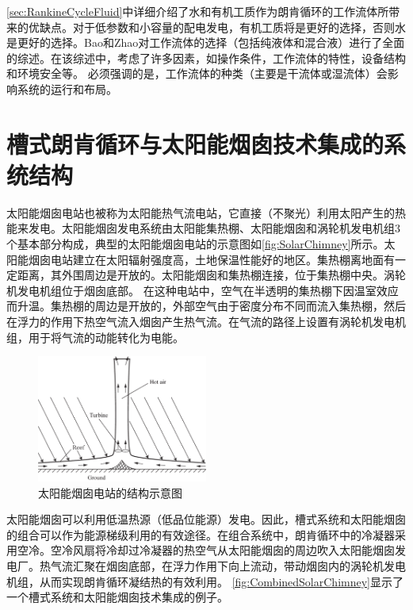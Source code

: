 \autoref{sec:RankineCycleFluid}中详细介绍了水和有机工质作为朗肯循环的工作流体所带来的优缺点。对于低参数和小容量的配电发电，有机工质将是更好的选择，否则水是更好的选择。Bao和Zhao\cite{Bao2013}对工作流体的选择（包括纯液体和混合液）进行了全面的综述。在该综述中，考虑了许多因素，如操作条件，工作流体的特性，设备结构和环境安全等。
必须强调的是，工作流体的种类（主要是干流体或湿流体）会影响系统的运行和布局。

\section{槽式朗肯循环与太阳能烟囱技术集成的系统结构}
\label{sec:sc}

太阳能烟囱电站也被称为太阳能热气流电站，它直接（不聚光）利用太阳产生的热能来发电。太阳能烟囱发电系统由太阳能集热棚、太阳能烟囱和涡轮机发电机组3个基本部分构成，典型的太阳能烟囱电站的示意图如\autoref{fig:SolarChimney}所示。太阳能烟囱电站建立在太阳辐射强度高，土地保温性能好的地区。集热棚离地面有一定距离，其外围周边是开放的。太阳能烟囱和集热棚连接，位于集热棚中央。涡轮机发电机组位于烟囱底部。
在这种电站中，空气在半透明的集热棚下因温室效应而升温。集热棚的周边是开放的，外部空气由于密度分布不同而流入集热棚，然后在浮力的作用下热空气流入烟囱产生热气流。在气流的路径上设置有涡轮机发电机组，用于将气流的动能转化为电能。

\begin{figure}[!ht]
\centering 
\includegraphics[width=0.5\textwidth]{fig/SolarChimney}
\caption{太阳能烟囱电站的结构示意图}\label{fig:SolarChimney}
\end{figure}

太阳能烟囱可以利用低温热源（低品位能源）发电。因此，槽式系统和太阳能烟囱的组合可以作为能源梯级利用的有效途径。在组合系统中，朗肯循环中的冷凝器采用空冷。空冷风扇将冷却过冷凝器的热空气从太阳能烟囱的周边吹入太阳能烟囱发电厂。热气流汇聚在烟囱底部，在浮力作用下向上流动，带动烟囱内的涡轮机发电机组，从而实现朗肯循环凝结热的有效利用。
\autoref{fig:CombinedSolarChimney}显示了一个槽式系统和太阳能烟囱技术集成的例子。

